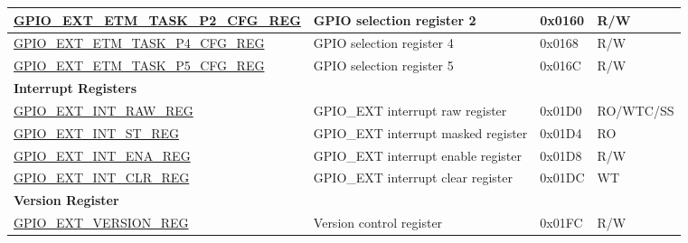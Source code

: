 \begin{longtable}{ | p{6cm} | p{7.2cm} | p{1.3cm} | p{1cm} | }
\hyperref[regdesc:GPIOEXTETMTASKP2CFGREG]{GPIO\_EXT\_ETM\_TASK\_P2\_CFG\_REG} & GPIO selection register 2 & 0x0160 & R/W \\ \hline
\hyperref[regdesc:GPIOEXTETMTASKP4CFGREG]{GPIO\_EXT\_ETM\_TASK\_P4\_CFG\_REG} & GPIO selection register 4 & 0x0168 & R/W \\ \hline
\hyperref[regdesc:GPIOEXTETMTASKP5CFGREG]{GPIO\_EXT\_ETM\_TASK\_P5\_CFG\_REG} & GPIO selection register 5 & 0x016C & R/W \\ \hline
\multicolumn{4}{|l|}{\textbf{Interrupt Registers}} \\ \hline
\hyperref[regdesc:GPIOEXTINTRAWREG]{GPIO\_EXT\_INT\_RAW\_REG} & GPIO\_EXT interrupt raw register & 0x01D0 & RO/WTC/SS \\ \hline
\hyperref[regdesc:GPIOEXTINTSTREG]{GPIO\_EXT\_INT\_ST\_REG} & GPIO\_EXT interrupt masked register & 0x01D4 & RO \\ \hline
\hyperref[regdesc:GPIOEXTINTENAREG]{GPIO\_EXT\_INT\_ENA\_REG} & GPIO\_EXT interrupt enable register & 0x01D8 & R/W \\ \hline
\hyperref[regdesc:GPIOEXTINTCLRREG]{GPIO\_EXT\_INT\_CLR\_REG} & GPIO\_EXT interrupt clear register & 0x01DC & WT \\ \hline
\multicolumn{4}{|l|}{\textbf{Version Register}} \\ \hline
\hyperref[regdesc:GPIOEXTVERSIONREG]{GPIO\_EXT\_VERSION\_REG} & Version control register & 0x01FC & R/W \\ \hline
\end{longtable}
